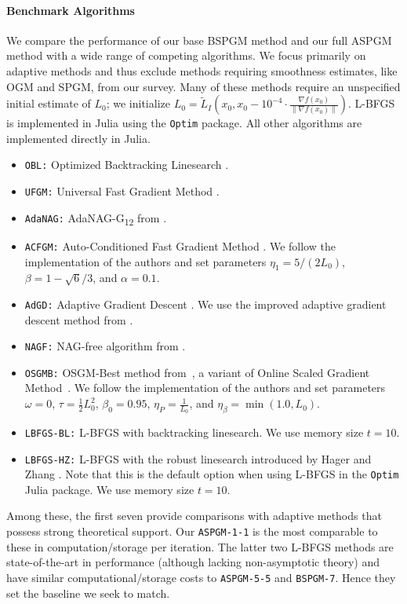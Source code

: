 \documentclass[11pt]{article}
\numberwithin{equation}{section}
\theoremstyle{definition}
\theoremstyle{plain}
\theoremstyle{definition}
\begin{document}
\paragraph{Benchmark Algorithms}
We compare the performance of our base BSPGM method and our full ASPGM method with a wide range of competing algorithms. We focus primarily on adaptive methods and thus exclude methods requiring smoothness estimates, like OGM and SPGM, from our survey. Many of these methods require an unspecified initial estimate of $L_0$; we initialize $L_0 = \tilde{L}_I(x_0, x_0 - 10^{-4} \cdot \frac{\nabla f(x_0)}{\|\nabla f(x_0)\|})$. L-BFGS is implemented in Julia using the \texttt{Optim} \cite{Optim} package. All other algorithms are implemented directly in Julia.
\begin{itemize}
    \item \texttt{OBL:} Optimized Backtracking Linesearch \cite{OBL}.
    \item \texttt{UFGM:} Universal Fast Gradient Method \cite{UFGM_Nesterov}.
    \item \texttt{AdaNAG:} AdaNAG-G\textsubscript{12} from \cite[Corollary 7]{AdaNAG_Suh}.
    \item \texttt{ACFGM:} Auto-Conditioned Fast Gradient Method \cite{ACFGM_Li}. We follow the implementation of the authors and set parameters $\eta_1 = 5/(2L_0)$, $\beta=1-\sqrt{6}/3$, and $\alpha=0.1$.
    \item \texttt{AdGD:} Adaptive Gradient Descent \cite{AdGD_Prox2_Malitsky}. We use the improved adaptive gradient descent method from \cite[Algorithm 2]{AdGD_Prox2_Malitsky}.
    \item \texttt{NAGF:} NAG-free algorithm from \cite[Algorithm 2]{NAGFree_Cavalcanti}.
    \item \texttt{OSGMB:} OSGM-Best method from~\cite{OSGMBest}, a variant of Online Scaled Gradient Method~\cite{OnlineScaling_Gao}. We follow the implementation of the authors and set parameters $\omega=0$, $\tau=\frac{1}{2}L_0^2$, $\beta_0 = 0.95$, $\eta_P = \frac{1}{L_0}$, and $\eta_\beta = \min(1.0,L_0)$.
    \item \texttt{LBFGS-BL:} L-BFGS with backtracking linesearch. We use memory size $t=10$.
    \item \texttt{LBFGS-HZ:} L-BFGS with the robust linesearch introduced by Hager and Zhang \cite{HagerZhang}. Note that this is the default option when using L-BFGS in the \texttt{Optim} Julia package. We use memory size $t=10$.
\end{itemize}
Among these, the first seven provide comparisons with adaptive methods that possess strong theoretical support. Our \texttt{ASPGM-1-1} is the most comparable to these in computation/storage per iteration. The latter two L-BFGS methods are state-of-the-art in performance (although lacking non-asymptotic theory) and have similar computational/storage costs to \texttt{ASPGM-5-5} and \texttt{BSPGM-7}. Hence they set the baseline we seek to match.
\end{document}
